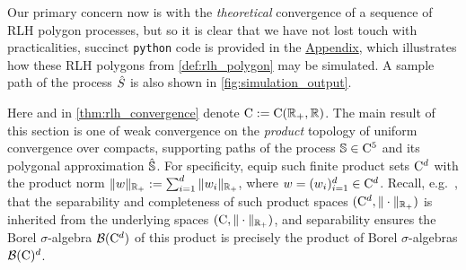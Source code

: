 Our primary concern now is with the \emph{theoretical} convergence of a sequence of RLH polygon processes, but so it is clear that we have not lost touch with practicalities, succinct \texttt{python} code is provided in the \hyperlink{appendix}{Appendix}, which illustrates how these RLH polygons from \autoref{def:rlh_polygon} may be simulated. A sample path of the process ${\hat{S}}$ is also shown in \autoref{fig:simulation_output}.

Here and in \autoref{thm:rlh_convergence} denote $\mathrm{C}:=\mathrm{C}(\mathbb{R}_+,\mathbb{R})$. The main result of this section is one of weak convergence on the \emph{product} topology of uniform convergence over compacts, supporting paths of the process $\mathbb{S}\in\mathrm{C}^5$ and its polygonal approximation $\hat{\mathbb{S}}$. For specificity, equip such finite product sets $\mathrm{C}^d$ with the product norm $\Vert w\Vert_{\mathbb{R}_+}:=\sum_{i=1}^d \Vert w_i \Vert_{\mathbb{R}_+}$, where $w=(w_i)_{i=1}^d\in\mathrm{C}^d$. Recall, e.g.~\cite{billingsley_1999}, that the separability and completeness of such product spaces $(\mathrm{C}^d,\Vert\cdot\Vert_{\mathbb{R}_+})$ is inherited from the underlying spaces $(\mathrm{C},\Vert\cdot\Vert_{\mathbb{R}_+})$, and separability ensures the Borel $\sigma$-algebra $\mathcal{B}(\mathrm{C}^d)$ of this product is precisely the product of Borel $\sigma$-algebras $\mathcal{B}(\mathrm{C})^d$.

